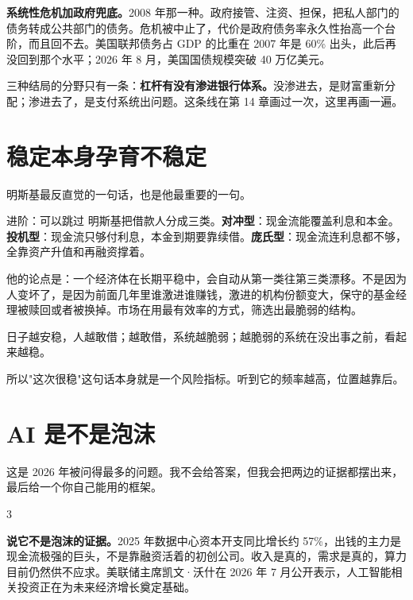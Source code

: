 \textbf{系统性危机加政府兜底。}2008 年那一种。政府接管、注资、担保，把私人部门的债务转成公共部门的债务。危机被中止了，代价是政府债务率永久性抬高一个台阶，而且回不去。美国联邦债务占 GDP 的比重在 2007 年是 60\% 出头，此后再没回到那个水平；2026 年 8 月，美国国债规模突破 40 万亿美元。

三种结局的分野只有一条：\textbf{杠杆有没有渗进银行体系。}没渗进去，是财富重新分配；渗进去了，是支付系统出问题。这条线在第 14 章画过一次，这里再画一遍。

\section{稳定本身孕育不稳定}

明斯基最反直觉的一句话，也是他最重要的一句。

\begin{deepbox}{进阶：可以跳过}
明斯基把借款人分成三类。\textbf{对冲型}：现金流能覆盖利息和本金。\textbf{投机型}：现金流只够付利息，本金到期要靠续借。\textbf{庞氏型}：现金流连利息都不够，全靠资产升值和再融资撑着。

他的论点是：一个经济体在长期平稳中，会自动从第一类往第三类漂移。不是因为人变坏了，是因为前面几年里谁激进谁赚钱，激进的机构份额变大，保守的基金经理被赎回或者被换掉。市场在用最有效率的方式，筛选出最脆弱的结构。

\end{deepbox}

日子越安稳，人越敢借；越敢借，系统越脆弱；越脆弱的系统在没出事之前，看起来越稳。

所以"这次很稳"这句话本身就是一个风险指标。听到它的频率越高，位置越靠后。

\section{AI 是不是泡沫}

这是 2026 年被问得最多的问题。我不会给答案，但我会把两边的证据都摆出来，最后给一个你自己能用的框架。

\begin{statrow}{3}
\end{statrow}

\textbf{说它不是泡沫的证据。}2025 年数据中心资本开支同比增长约 57\%，出钱的主力是现金流极强的巨头，不是靠融资活着的初创公司。收入是真的，需求是真的，算力目前仍然供不应求。美联储主席凯文·沃什在 2026 年 7 月公开表示，人工智能相关投资正在为未来经济增长奠定基础。

